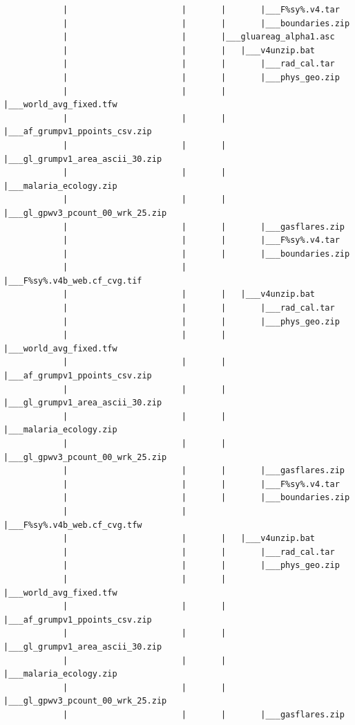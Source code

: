 \documentclass[
]{book}
\begin{document}
\begin{verbatim}
            |                       |       |       |___F%sy%.v4.tar
            |                       |       |       |___boundaries.zip
            |                       |       |___gluareag_alpha1.asc
            |                       |       |   |___v4unzip.bat
            |                       |       |       |___rad_cal.tar
            |                       |       |       |___phys_geo.zip
            |                       |       |       |___world_avg_fixed.tfw
            |                       |       |       |___af_grumpv1_ppoints_csv.zip
            |                       |       |       |___gl_grumpv1_area_ascii_30.zip
            |                       |       |       |___malaria_ecology.zip
            |                       |       |       |___gl_gpwv3_pcount_00_wrk_25.zip
            |                       |       |       |___gasflares.zip
            |                       |       |       |___F%sy%.v4.tar
            |                       |       |       |___boundaries.zip
            |                       |       |___F%sy%.v4b_web.cf_cvg.tif
            |                       |       |   |___v4unzip.bat
            |                       |       |       |___rad_cal.tar
            |                       |       |       |___phys_geo.zip
            |                       |       |       |___world_avg_fixed.tfw
            |                       |       |       |___af_grumpv1_ppoints_csv.zip
            |                       |       |       |___gl_grumpv1_area_ascii_30.zip
            |                       |       |       |___malaria_ecology.zip
            |                       |       |       |___gl_gpwv3_pcount_00_wrk_25.zip
            |                       |       |       |___gasflares.zip
            |                       |       |       |___F%sy%.v4.tar
            |                       |       |       |___boundaries.zip
            |                       |       |___F%sy%.v4b_web.cf_cvg.tfw
            |                       |       |   |___v4unzip.bat
            |                       |       |       |___rad_cal.tar
            |                       |       |       |___phys_geo.zip
            |                       |       |       |___world_avg_fixed.tfw
            |                       |       |       |___af_grumpv1_ppoints_csv.zip
            |                       |       |       |___gl_grumpv1_area_ascii_30.zip
            |                       |       |       |___malaria_ecology.zip
            |                       |       |       |___gl_gpwv3_pcount_00_wrk_25.zip
            |                       |       |       |___gasflares.zip

\end{verbatim}
\end{document}
